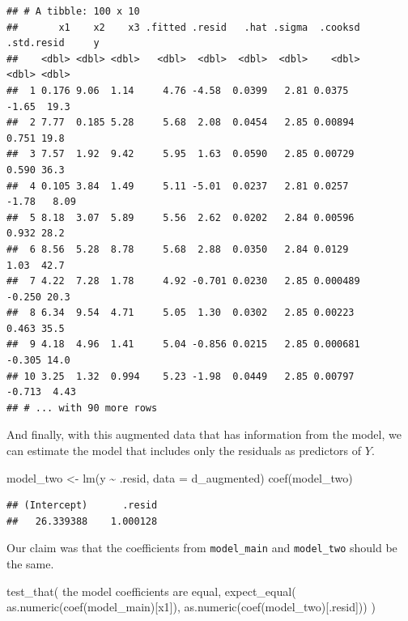 \documentclass[
]{book}
\newenvironment{Shaded}{\begin{snugshade}}{\end{snugshade}}
\newcommand{\AttributeTok}[1]{\textcolor[rgb]{0.77,0.63,0.00}{#1}}
\newcommand{\FunctionTok}[1]{\textcolor[rgb]{0.00,0.00,0.00}{#1}}
\newcommand{\NormalTok}[1]{#1}
\newcommand{\OtherTok}[1]{\textcolor[rgb]{0.56,0.35,0.01}{#1}}
\newcommand{\SpecialCharTok}[1]{\textcolor[rgb]{0.00,0.00,0.00}{#1}}
\newcommand{\StringTok}[1]{\textcolor[rgb]{0.31,0.60,0.02}{#1}}
\theoremstyle{definition}
\theoremstyle{definition}
\theoremstyle{definition}
\theoremstyle{definition}
\theoremstyle{remark}
\begin{document}
\begin{verbatim}
## # A tibble: 100 x 10
##       x1    x2    x3 .fitted .resid   .hat .sigma  .cooksd .std.resid     y
##    <dbl> <dbl> <dbl>   <dbl>  <dbl>  <dbl>  <dbl>    <dbl>      <dbl> <dbl>
##  1 0.176 9.06  1.14     4.76 -4.58  0.0399   2.81 0.0375       -1.65  19.3 
##  2 7.77  0.185 5.28     5.68  2.08  0.0454   2.85 0.00894       0.751 19.8 
##  3 7.57  1.92  9.42     5.95  1.63  0.0590   2.85 0.00729       0.590 36.3 
##  4 0.105 3.84  1.49     5.11 -5.01  0.0237   2.81 0.0257       -1.78   8.09
##  5 8.18  3.07  5.89     5.56  2.62  0.0202   2.84 0.00596       0.932 28.2 
##  6 8.56  5.28  8.78     5.68  2.88  0.0350   2.84 0.0129        1.03  42.7 
##  7 4.22  7.28  1.78     4.92 -0.701 0.0230   2.85 0.000489     -0.250 20.3 
##  8 6.34  9.54  4.71     5.05  1.30  0.0302   2.85 0.00223       0.463 35.5 
##  9 4.18  4.96  1.41     5.04 -0.856 0.0215   2.85 0.000681     -0.305 14.0 
## 10 3.25  1.32  0.994    5.23 -1.98  0.0449   2.85 0.00797      -0.713  4.43
## # ... with 90 more rows
\end{verbatim}

And finally, with this augmented data that has information from the model, we can estimate the model that includes only the residuals as predictors of \(Y\).

\begin{Shaded}
\begin{Highlighting}[]
\NormalTok{model\_two }\OtherTok{\textless{}{-}} \FunctionTok{lm}\NormalTok{(y }\SpecialCharTok{\textasciitilde{}}\NormalTok{ .resid, }\AttributeTok{data =}\NormalTok{ d\_augmented)}
\FunctionTok{coef}\NormalTok{(model\_two)}
\end{Highlighting}
\end{Shaded}

\begin{verbatim}
## (Intercept)      .resid 
##   26.339388    1.000128
\end{verbatim}

Our claim was that the coefficients from \texttt{model\_main} and \texttt{model\_two} should be the same.

\begin{Shaded}
\begin{Highlighting}[]
\FunctionTok{test\_that}\NormalTok{(}
  \StringTok{\textquotesingle{}the model coefficients are equal\textquotesingle{}}\NormalTok{, }
  \FunctionTok{expect\_equal}\NormalTok{(}
    \FunctionTok{as.numeric}\NormalTok{(}\FunctionTok{coef}\NormalTok{(model\_main)[}\StringTok{\textquotesingle{}x1\textquotesingle{}}\NormalTok{]), }
    \FunctionTok{as.numeric}\NormalTok{(}\FunctionTok{coef}\NormalTok{(model\_two)[}\StringTok{\textquotesingle{}.resid\textquotesingle{}}\NormalTok{]))}
\NormalTok{)}
\end{Highlighting}
\end{Shaded}
\end{document}
